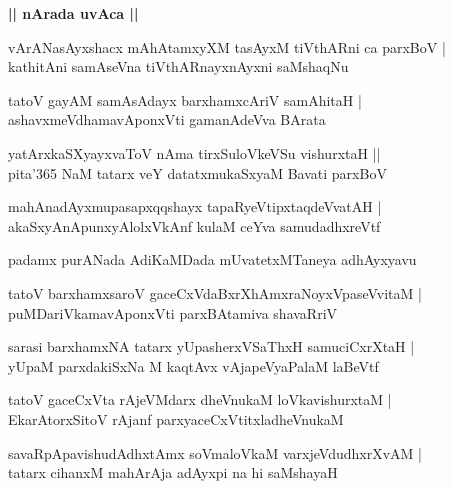 \documentclass[twoside,12pt,openright]{book}
\newcounter{shloka}[chapter]
\def\uvaca#1{\centerline{{\large\textbf{#1}}}}
\begin{document}
\uvaca{ || nArada uvAca || }

\begin{shloka}
vArANasAyxshacx mAhAtamxyXM tasAyxM tiVthARni ca parxBoV |\\
kathitAni samAseVna tiVthARnayxnAyxni saMshaqNu 
\end{shloka}

\begin{shloka}
tatoV gayAM samAsAdayx barxhamxcAriV samAhitaH |\\
ashavxmeVdhamavAponxVti gamanAdeVva BArata
\end{shloka}

\begin{shloka}
yatArxkaSXyayxvaToV nAma tirxSuloVkeVSu vishurxtaH ||\\
pita\char'365 NaM tatarx veY datatxmukaSxyaM Bavati parxBoV 
\end{shloka}

\begin{shloka}
mahAnadAyxmupasapxqqshayx tapaRyeVtipxtaqdeVvatAH |\\
akaSxyAnApunxyAlolxVkAnf kulaM ceYva samudadhxreVtf
\end{shloka}

\begin{center}
padamx purANada AdiKaMDada mUvatetxMTaneya adhAyxyavu
\end{center}

\begin{shloka}
tatoV barxhamxsaroV gaceCxVdaBxrXhAmxraNoyxVpaseVvitaM |\\
puMDariVkamavAponxVti parxBAtamiva shavaRriV 
\end{shloka}

\begin{shloka}
sarasi barxhamxNA tatarx yUpasherxVSaThxH samuciCxrXtaH |\\
yUpaM parxdakiSxNa M kaqtAvx vAjapeVyaPalaM laBeVtf 
\end{shloka}

\begin{shloka}
tatoV gaceCxVta rAjeVMdarx dheVnukaM loVkavishurxtaM |\\
EkarAtorxSitoV rAjanf parxyaceCxVtitxladheVnukaM 
\end{shloka}

\begin{shloka}
savaRpApavishudAdhxtAmx soVmaloVkaM varxjeVdudhxrXvAM |\\
tatarx cihanxM  mahArAja adAyxpi na hi saMshayaH 
\end{shloka}
\end{document}
